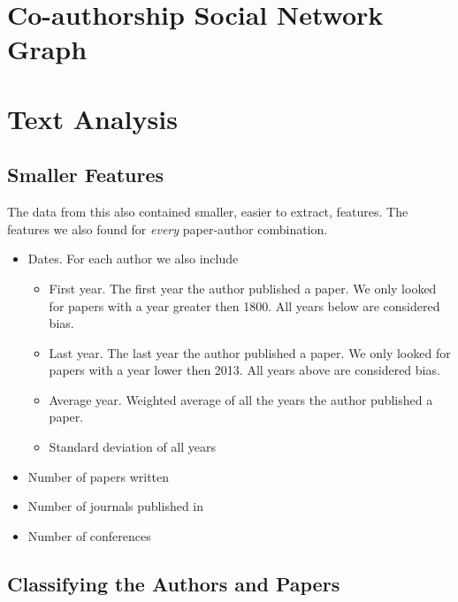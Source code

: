 
\section{Co-authorship Social Network Graph \label{sec:graph-implementation}}



\section{Text Analysis \label{sec:text-implementation}}



\subsection{Smaller Features \label{sec:smaller-features-implementation}}

The data from this also contained smaller, easier to extract, features. The features we also found for \textit{every} paper-author combination.

\begin{itemize}
\item[]Dates. For each author we also include
\begin{itemize}
\item[] First year. The first year the author published a paper. We only looked for papers with a year greater then 1800. All years below are considered bias.
\item[] Last year. The last year the author published a paper. We only looked for papers with a year lower then 2013. All years above are considered bias.
\item[] Average year. Weighted average of all the years the author published a paper.
\item[] Standard deviation of all years
\end{itemize}
\item[] Number of papers written
\item[] Number of journals published in 
\item[] Number of conferences
\end{itemize}


\subsection{Classifying the Authors and Papers \label{sec:classifier-implementation}}

